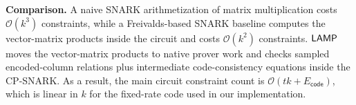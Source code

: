 \noindent\textbf{Comparison.}
A naive SNARK arithmetization of matrix multiplication costs
\(\mathcal{O}(k^3)\) constraints, while a Freivalds-based SNARK baseline computes
the vector-matrix products inside the circuit and costs \(\mathcal{O}(k^2)\) constraints.  
\(\textsf{LAMP}\) moves the vector-matrix products to native prover work and checks
sampled encoded-column relations plus intermediate code-consistency equations
inside the CP-SNARK.
As a result, the main circuit constraint count is
\(\mathcal{O}(tk+E_{\mathsf{code}})\), which is linear in \(k\) for the
fixed-rate code used in our implementation.


